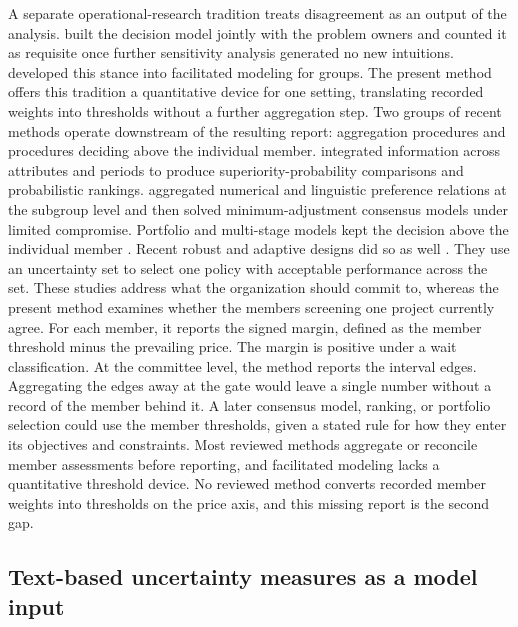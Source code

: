 A separate operational-research tradition treats disagreement as an output of the analysis. \citet{Phillips1984} built the decision model jointly with the problem owners and counted it as requisite once further sensitivity analysis generated no new intuitions. \citet{FrancoMontibeller2010} developed this stance into facilitated modeling for groups. The present method offers this tradition a quantitative device for one setting, translating recorded weights into thresholds without a further aggregation step. Two groups of recent methods operate downstream of the resulting report: aggregation procedures and procedures deciding above the individual member. \citet{Dong2026} integrated information across attributes and periods to produce superiority-probability comparisons and probabilistic rankings. \citet{SongLi2026} aggregated numerical and linguistic preference relations at the subgroup level and then solved minimum-adjustment consensus models under limited compromise. Portfolio and multi-stage models kept the decision above the individual member \citep{Marques2022,ShenLi2023,Saiz2024}. Recent robust and adaptive designs did so as well \citep{Shen2025,ShavazipourStewart2026}. They use an uncertainty set to select one policy with acceptable performance across the set. These studies address what the organization should commit to, whereas the present method examines whether the members screening one project currently agree. For each member, it reports the signed margin, defined as the member threshold minus the prevailing price. The margin is positive under a wait classification. At the committee level, the method reports the interval edges. Aggregating the edges away at the gate would leave a single number without a record of the member behind it. A later consensus model, ranking, or portfolio selection could use the member thresholds, given a stated rule for how they enter its objectives and constraints. Most reviewed methods aggregate or reconcile member assessments before reporting, and facilitated modeling lacks a quantitative threshold device. No reviewed method converts recorded member weights into thresholds on the price axis, and this missing report is the second gap.

\subsection{Text-based uncertainty measures as a model input}

